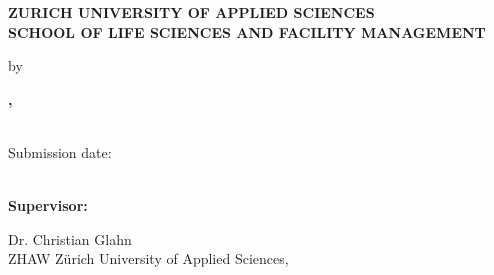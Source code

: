 \begin{titlepage}
  \thispagestyle{empty}
  \centering

  {\large\bfseries ZURICH UNIVERSITY OF APPLIED SCIENCES\\
  SCHOOL OF LIFE SCIENCES AND FACILITY MANAGEMENT\\
  \MakeUppercase{\institute}\par}

  \vspace{3.5cm}

  {\LARGE\bfseries \thesistitle\par}

  \vspace{2.5cm}

  {\Large \thesistype\par}

  \vspace{2cm}

  {\large by\par}
  \vspace{0.3cm}
  {\large\bfseries \authorlast, \authorfirst\par}
  \vspace{0.3cm}
  {\large \degreeprogramme\\
  Submission date: \submissiondate\\
  \specialisation\\
  \minors\par}

  \vfill

  \raggedright
  {\large\bfseries Supervisor:\par}
  \vspace{0.2cm}
  {\large Dr. Christian Glahn\\
  ZHAW Zürich University of Applied Sciences, \institute\\
  \par}
\end{titlepage}
